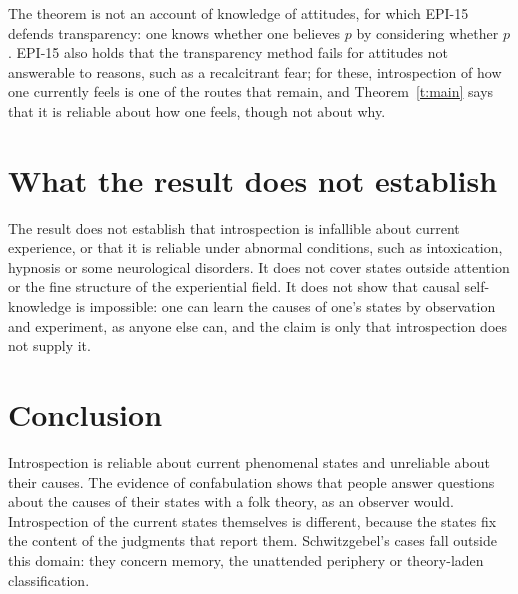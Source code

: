\documentclass{situationist-preprint}
\begin{document}
\begin{reply}
The theorem is not an account of knowledge of attitudes, for which EPI-15 defends transparency: one knows whether one believes $p$ by considering whether $p$ \citep[see also][]{Byrne2018}. EPI-15 also holds that the transparency method fails for attitudes not answerable to reasons, such as a recalcitrant fear; for these, introspection of how one currently feels is one of the routes that remain, and Theorem~\ref{t:main} says that it is reliable about how one feels, though not about why.
\end{reply}

\section{What the result does not establish}

The result does not establish that introspection is infallible about current experience, or that it is reliable under abnormal conditions, such as intoxication, hypnosis or some neurological disorders. It does not cover states outside attention or the fine structure of the experiential field. It does not show that causal self-knowledge is impossible: one can learn the causes of one's states by observation and experiment, as anyone else can, and the claim is only that introspection does not supply it.

\section{Conclusion}

Introspection is reliable about current phenomenal states and unreliable about their causes. The evidence of confabulation shows that people answer questions about the causes of their states with a folk theory, as an observer would. Introspection of the current states themselves is different, because the states fix the content of the judgments that report them. Schwitzgebel's cases fall outside this domain: they concern memory, the unattended periphery or theory-laden classification.
\end{document}
